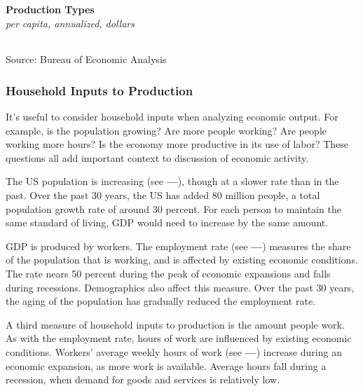 \documentclass{report}
\begin{document}
\begin{minipage}{0.76\textwidth}

\normalsize \textbf{Production Types}\\
\footnotesize{\textit{per capita, annualized, dollars}}\\
\hspace{-2mm}  \setlength{\tabcolsep}{3.7pt} \color{black!90}
		{\renewcommand{\arraystretch}{1.6}
		 \begin{tabular}{p{38mm} R{12.8mm} R{12.8mm} R{12.8mm} R{12.8mm} R{12.8mm}}
			 \hline
		\end{tabular}}
\vspace{-2mm}

\footnotesize{Source: Bureau of Economic Analysis}
\end{minipage}
\newpage
\begin{minipage}{0.76\textwidth}
\subsubsection*{Household Inputs to Production}
\small It's useful to consider household inputs when analyzing economic output. For example, is the population growing? Are more people working? Are people working more hours? Is the economy more productive in its use of labor? These questions all add important context to discussion of economic activity.

The US population is increasing (see {\color{lime!90!green}\textbf{---}}), though at a slower rate than in the past. Over the past 30 years, the US has added 80 million people, a total population growth rate of around 30 percent. For each person to maintain the same standard of living, GDP would need to increase by the same amount. 

GDP is produced by workers. The employment rate (see {\color{green!30!teal!90!black}\textbf{---}}) measures the share of the population that is working, and is affected by existing economic conditions. The rate nears 50 percent during the peak of economic expansions and falls during recessions. Demographics also affect this measure. Over the past 30 years, the aging of the population has gradually reduced the employment rate.

A third measure of household inputs to production is the amount people work. As with the employment rate, hours of work are influenced by existing economic conditions. Workers' average weekly hours of work (see {\color{blue}\textbf{---}}) increase during an economic expansion, as more work is available. Average hours fall during a recession, when demand for goods and services is relatively low.
\end{minipage}
\vspace{2mm}
\end{document}
